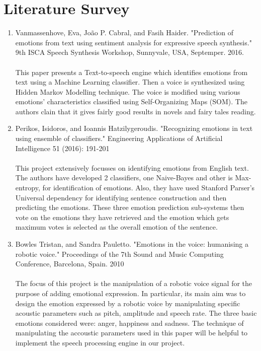 \documentclass[oneside,a4paper,12pt]{book}
\begin{document}
\section{Literature Survey}
\begin{enumerate}
	\item[\lbrack1\rbrack] Vanmassenhove, Eva, João P. Cabral, and Fasih Haider. "Prediction of emotions from text using sentiment analysis for expressive speech synthesis." 9th ISCA Speech Synthesis Workshop, Sunnyvale, USA, Septemper. 2016. \\\\
		 This paper presents a Text-to-speech engine which identifies emotions from text using a Machine Learning classifier. Then a voice is synthesized using Hidden Markov Modelling technique. The voice is modified using various emotions' characteristics classified using Self-Organizing Maps (SOM). The authors clain that it gives fairly good results in novels and fairy tales reading.
	\item[\lbrack2\rbrack] Perikos, Isidoros, and Ioannis Hatzilygeroudis. "Recognizing emotions in text using ensemble of classifiers." Engineering Applications of Artificial Intelligence 51 (2016): 191-201\\\\
	 This project extensively focusses on identifying emotions from English text. The authors have developed 2 classifiers, one Naive-Bayes and other is Max-entropy, for identification of emotions. Also, they have used Stanford Parser's Universal dependency for identifying sentence construction and then predicting the emotions. These three emotion prediction sub-systems then vote on the emotions they have retrieved and the emotion which gets maximum votes is selected as the overall emotion of the sentence.
	\item[\lbrack3\rbrack] Bowles Tristan, and Sandra Pauletto. "Emotions in the voice: humanising a robotic voice." Proceedings of the 7th Sound and Music Computing Conference, Barcelona, Spain. 2010\\\\
	The focus of this project is the manipulation of a robotic	voice signal for the purpose of adding emotional expression. In particular, its main aim was to design the emotion expressed by a robotic voice by manipulating specific acoustic parameters such as pitch, amplitude and speech rate. The three basic emotions considered were: anger, happiness and sadness.
		The technique of manipulating the accoustic parameters used in this paper will be helpful to implement the speech processing engine in our project. 

\end{enumerate}
\end{document}
